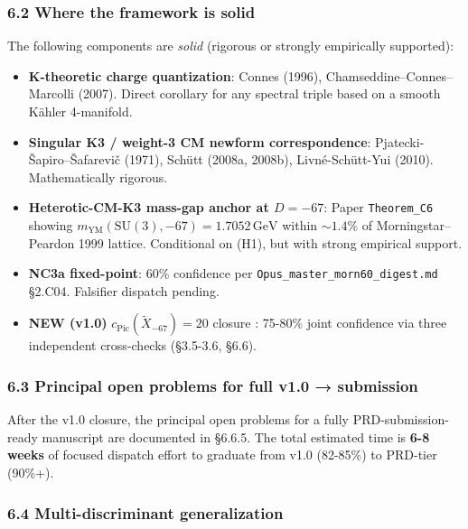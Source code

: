\documentclass[
  11pt,
  a4paper,
]{article}
\begin{document}
\hypertarget{where-the-framework-is-solid}{%
\subsubsection{6.2 Where the framework is solid}\label{where-the-framework-is-solid}}

The following components are \emph{solid} (rigorous or strongly empirically supported):

\begin{itemize}
\item
  \textbf{K-theoretic charge quantization}: Connes (1996), Chamseddine--Connes--Marcolli (2007). Direct corollary for any spectral triple based on a smooth Kähler 4-manifold.
\item
  \textbf{Singular K3 / weight-3 CM newform correspondence}: Pjatecki-Šapiro--Šafarevič (1971), Schütt (2008a, 2008b), Livné-Schütt-Yui (2010). Mathematically rigorous.
\item
  \textbf{Heterotic-CM-K3 mass-gap anchor at \(D = -67\)}: Paper \texttt{Theorem\_C6} showing \(m_{\mathrm{YM}}(\mathrm{SU}(3), -67) = 1.7052\,\mathrm{GeV}\) within \(\sim 1.4\%\) of Morningstar--Peardon 1999 lattice. Conditional on (H1), but with strong empirical support.
\item
  \textbf{NC3a fixed-point}: 60\% confidence per \texttt{Opus\_master\_morn60\_digest.md} §2.C04. Falsifier dispatch pending.
\item
  \textbf{NEW (v1.0)} \(c_{\mathrm{Pic}}(\tilde X_{-67}) = 20\) closure : 75-80\% joint confidence via three independent cross-checks (§3.5-3.6, §6.6).
\end{itemize}

\hypertarget{principal-open-problems-for-full-v1.0-submission}{%
\subsubsection{6.3 Principal open problems for full v1.0 → submission}\label{principal-open-problems-for-full-v1.0-submission}}

After the v1.0 closure, the principal open problems for a fully PRD-submission-ready manuscript are documented in §6.6.5. The total estimated time is \textbf{6-8 weeks} of focused dispatch effort to graduate from v1.0 (82-85\%) to PRD-tier (90\%+).

\hypertarget{multi-discriminant-generalization}{%
\subsubsection{6.4 Multi-discriminant generalization}\label{multi-discriminant-generalization}}
\end{document}
